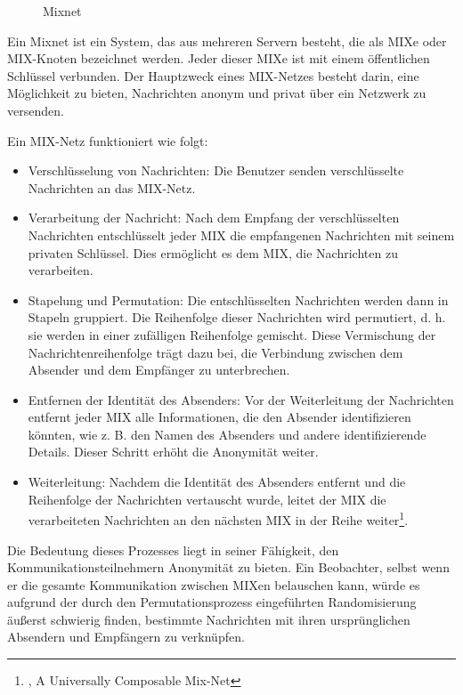 \begin{figure}[h!]
    \centering
    
    \caption{Mixnet}
    \label{imgs:mixnet}
\end{figure}

Ein Mixnet ist ein System, das aus mehreren Servern besteht, die als MIXe oder MIX-Knoten bezeichnet werden. Jeder dieser MIXe ist mit einem öffentlichen Schlüssel verbunden. Der Hauptzweck eines MIX-Netzes besteht darin, eine Möglichkeit zu bieten, Nachrichten anonym und privat über ein Netzwerk zu versenden.

Ein MIX-Netz funktioniert wie folgt:

\begin{itemize}

\item Verschlüsselung von Nachrichten: Die Benutzer senden verschlüsselte Nachrichten an das MIX-Netz.

\item Verarbeitung der Nachricht: Nach dem Empfang der verschlüsselten Nachrichten entschlüsselt jeder MIX die empfangenen Nachrichten mit seinem privaten Schlüssel. Dies ermöglicht es dem MIX, die Nachrichten zu verarbeiten.

\item Stapelung und Permutation: Die entschlüsselten Nachrichten werden dann in Stapeln gruppiert. Die Reihenfolge dieser Nachrichten wird permutiert, d. h. sie werden in einer zufälligen Reihenfolge gemischt. Diese Vermischung der Nachrichtenreihenfolge trägt dazu bei, die Verbindung zwischen dem Absender und dem Empfänger zu unterbrechen.

\item Entfernen der Identität des Absenders: Vor der Weiterleitung der Nachrichten entfernt jeder MIX alle Informationen, die den Absender identifizieren könnten, wie z. B. den Namen des Absenders und andere identifizierende Details. Dieser Schritt erhöht die Anonymität weiter.

\item Weiterleitung: Nachdem die Identität des Absenders entfernt und die Reihenfolge der Nachrichten vertauscht wurde, leitet der MIX die verarbeiteten Nachrichten an den nächsten MIX in der Reihe weiter\footnote{\cite{ComposableMixNet}, A Universally Composable Mix-Net}.

\end{itemize}

Die Bedeutung dieses Prozesses liegt in seiner Fähigkeit, den Kommunikationsteilnehmern Anonymität zu bieten. Ein Beobachter, selbst wenn er die gesamte Kommunikation zwischen MIXen belauschen kann, würde es aufgrund der durch den Permutationsprozess eingeführten Randomisierung äußerst schwierig finden, bestimmte Nachrichten mit ihren ursprünglichen Absendern und Empfängern zu verknüpfen.

